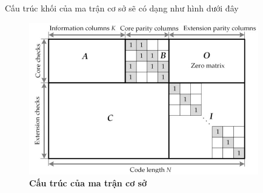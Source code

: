 \documentclass{article}
\begin{document}
Cấu trúc khối của ma trận cơ sở sẽ có dạng như hình dưới đây
\begin{figure}[H]
    \centering
    \includegraphics[width=10cm]{images/Matrancoso.JPG}
    \caption[Cấu trúc của ma trận cơ sở]{\bfseries\fontsize{12pt}{0pt} \selectfont Cấu trúc của ma trận cơ sở} %
    \label{hinh11}
\end{figure}
\end{document}
